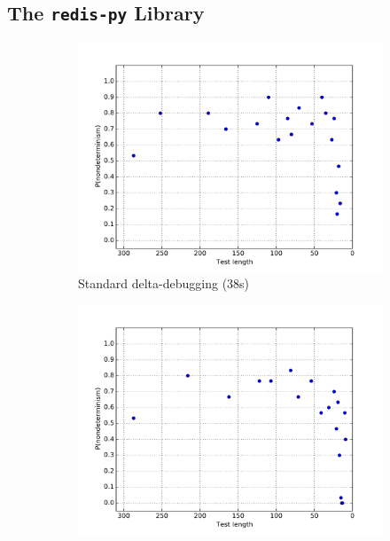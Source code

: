 
\subsection {The {\tt redis-py} Library}


\begin{figure}
\centering 
\begin{subfigure}{0.3\columnwidth}
\centering
\includegraphics[width=\columnwidth]{redisddmin}
\caption{Standard delta-debugging (38s)}
\label{fig:r1}
\end{subfigure}
\begin{subfigure}{0.3\columnwidth}
\centering
\includegraphics[width=\columnwidth]{redisforcep}

\end{subfigure}
\end{figure}
